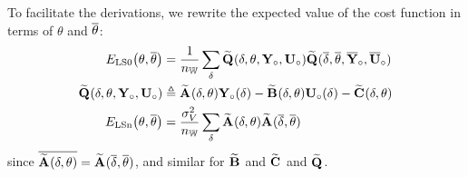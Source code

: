To facilitate the derivations, we rewrite the expected value of the cost function in terms of $\theta$ and $\conj{\theta}$:
\begin{align}
   \ELSCost[0]{\theta,\conj{\theta}} & =
      \frac{1}{\nWind}
           \sum_{\dW}
           \LocalModel{Q}(      \dW,        \LocalVector{\theta},  \true{      \LocalVector{Y}},  \true{      \LocalVector{U} })
           \LocalModel{Q}(\conj{\dW}, \conj{\LocalVector{\theta}}, \true{\conj{\LocalVector{Y}}}, \true{\conj{\LocalVector{U}}})
   \\
   \LocalModel{Q}(\dW, \LocalVector{\theta},  \true{\LocalVector{Y}},  \true{ \LocalVector{U} }) & \isdef
                 \LocalModel{A}(\dW, \LocalVector{\theta}) \true{\LocalVector{Y}}(\dW)
               - \LocalModel{B}(\dW, \LocalVector{\theta}) \true{\LocalVector{U}}(\dW)
               - \LocalModel{C}(\dW, \LocalVector{\theta})
    \\             
    \ELSCost[n]{\theta,\conj{\theta}} & =
              \frac{\sigma_V^2}{\nWind} 
                     \sum_{\delta} 
                               \LocalModel{A}(      \dW,        \LocalVector{\theta} ) 
                               \LocalModel{A}(\conj{\dW}, \conj{\LocalVector{\theta}}) 
\end{align}
since $\conj{ \LocalModel{A}(\dW,\theta)} =  \LocalModel{A}(\conj{\dW},\conj{\theta}) $, and similar for $\LocalModel{B}$ and $\LocalModel{C}$ and $\LocalModel{Q}$.

